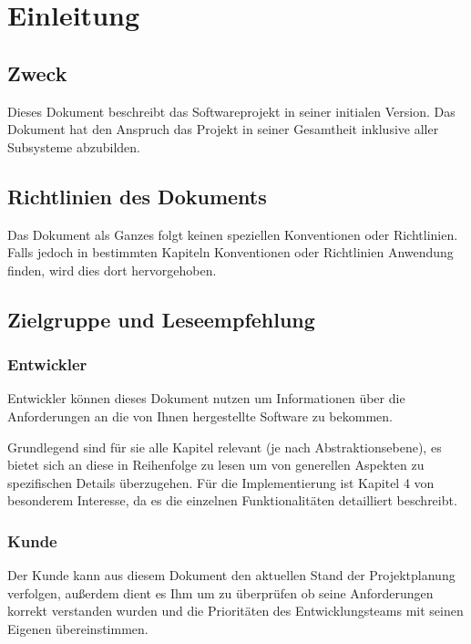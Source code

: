 \section{Einleitung}
\subsection{Zweck}
Dieses Dokument beschreibt das Softwareprojekt  in seiner initialen Version.
Das Dokument hat den Anspruch das Projekt in seiner Gesamtheit inklusive aller Subsysteme abzubilden.

\subsection{Richtlinien des Dokuments}
Das Dokument als Ganzes folgt keinen speziellen Konventionen oder Richtlinien. %
Falls jedoch in bestimmten Kapiteln Konventionen oder Richtlinien Anwendung finden, wird dies dort hervorgehoben. 

\subsection{Zielgruppe und Leseempfehlung}
\subsubsection{Entwickler}

Entwickler können dieses Dokument nutzen um Informationen über die Anforderungen an die von Ihnen hergestellte Software zu bekommen. 

Grundlegend sind für sie alle Kapitel relevant (je nach Abstraktionsebene), es bietet sich an diese in Reihenfolge zu lesen um von generellen Aspekten zu spezifischen Details überzugehen. Für die Implementierung ist Kapitel 4 von besonderem Interesse, da es die einzelnen Funktionalitäten detailliert beschreibt.

\subsubsection{Kunde}

Der Kunde kann aus diesem Dokument den aktuellen Stand der Projektplanung verfolgen, außerdem dient es Ihm um zu überprüfen ob seine Anforderungen korrekt verstanden wurden und die Prioritäten des Entwicklungsteams mit seinen Eigenen übereinstimmen.

